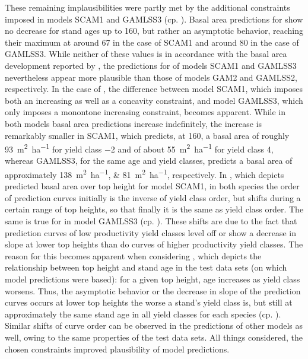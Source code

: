 These remaining implausibilities were partly met by the additional constraints imposed in models SCAM1 and GAMLSS3 (cp. ).  Basal area predictions for \Beech{} show no decrease for stand ages up to \SI{160}{\year}, but rather an asymptotic behavior, reaching their maximum at around \SI{67}{\year} in the case of SCAM1 and around \SI{80}{\year} in the case of GAMLSS3.  While neither of these values is in accordance with the basal area development reported by \textcite{Schober1995}, the predictions for \Beech{} of models SCAM1 and GAMLSS3 nevertheless appear more plausible than those of models GAM2 and GAMLSS2, respectively.  In the case of \Spruce{}, the difference between model SCAM1, which imposes both an increasing as well as a concavity constraint, and model GAMLSS3, which only imposes a monontone increasing constraint, becomes apparent.  While in both models basal area predictions increase indefinitely, the increase is remarkably smaller in SCAM1, which predicts, at \SI{160}{\year}, a basal area of roughly \SI{93}{\square\meter\per\hectare} for yield class \num{-2} and of about \SI{55}{\square\meter\per\hectare} for yield class \num{4}, whereas GAMLSS3, for the same age and yield classes, predicts a basal area of approximately \SIlist{138;81}{\square\meter\per\hectare}, respectively.
In , which depicts predicted basal area over top height for model SCAM1, in both species the order of prediction curves initially is the inverse of yield class order, but shifts during a certain range of top heights, so that finally it is the same as yield class order.
The same is true for \Beech{} in model GAMLSS3 (cp. ).  These shifts are due to the fact that prediction curves of low productivity yield classes level off or show a decrease in slope at lower top heights than do curves of higher productivity yield classes.
The reason for this becomes apparent when considering , which depicts the relationship between top height and stand age in the test data sets (on which model predictions were based):  for a given top height, age increases as yield class worsens.  Thus, the asymptotic behavior or the decrease in slope of the prediction curves occurs at lower top heights the worse a stand’s yield class is, but still at approximately the same stand age in all yield classes for each species (cp. ).  Similar shifts of curve order can be observed in the predictions of other models as well, owing to the same properties of the test data sets.
All things considered, the chosen constraints improved plausibility of model predictions.

